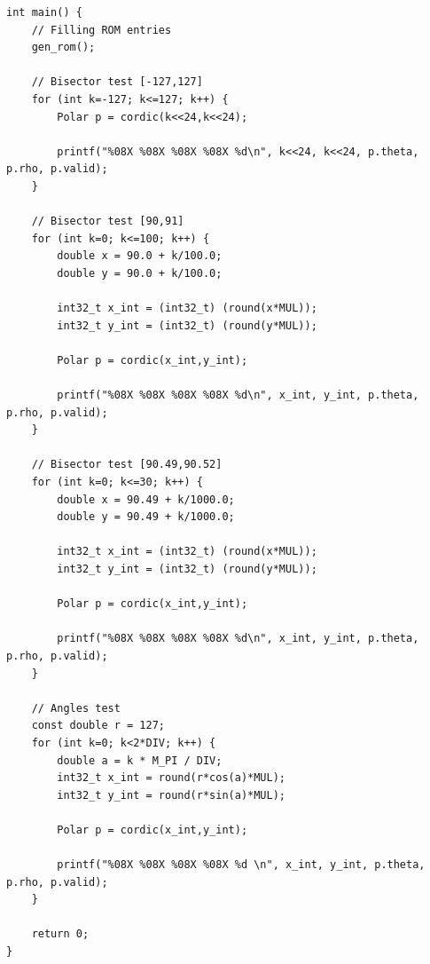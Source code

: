 \documentclass[12pt,a4paper]{report}
\begin{document}
\begin{lstlisting}[caption={Test-data generation}]
int main() {
    // Filling ROM entries
    gen_rom();
    
    // Bisector test [-127,127]
    for (int k=-127; k<=127; k++) {
        Polar p = cordic(k<<24,k<<24);
        
        printf("%08X %08X %08X %08X %d\n", k<<24, k<<24, p.theta, p.rho, p.valid);
    }
    
    // Bisector test [90,91]
    for (int k=0; k<=100; k++) {
        double x = 90.0 + k/100.0;
        double y = 90.0 + k/100.0;
        
        int32_t x_int = (int32_t) (round(x*MUL));
        int32_t y_int = (int32_t) (round(y*MUL));
        
        Polar p = cordic(x_int,y_int);
        
        printf("%08X %08X %08X %08X %d\n", x_int, y_int, p.theta, p.rho, p.valid);
    }
    
    // Bisector test [90.49,90.52]
    for (int k=0; k<=30; k++) {
        double x = 90.49 + k/1000.0;
        double y = 90.49 + k/1000.0;
        
        int32_t x_int = (int32_t) (round(x*MUL));
        int32_t y_int = (int32_t) (round(y*MUL));
        
        Polar p = cordic(x_int,y_int);
        
        printf("%08X %08X %08X %08X %d\n", x_int, y_int, p.theta, p.rho, p.valid);
    }
    
    // Angles test
    const double r = 127;
    for (int k=0; k<2*DIV; k++) {
        double a = k * M_PI / DIV;
        int32_t x_int = round(r*cos(a)*MUL);
        int32_t y_int = round(r*sin(a)*MUL);
        
        Polar p = cordic(x_int,y_int);
        
        printf("%08X %08X %08X %08X %d \n", x_int, y_int, p.theta, p.rho, p.valid);
    }
    
    return 0;
}

\end{lstlisting}
\end{document}
